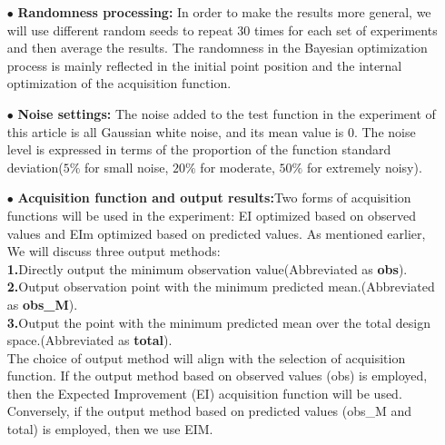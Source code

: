 \documentclass{article}
\begin{document}
\begin{itemize}
\item[$\bullet$] \textbf{Randomness processing:} In order to make the results more general, we will use different random seeds to repeat 30 times for each set of experiments and then average the results. The randomness in the Bayesian optimization process is mainly reflected in the initial point position and the internal optimization of the acquisition function.
\item[$\bullet$] \textbf{Noise settings:} The noise added to the test function in the experiment of this article is all Gaussian white noise, and its mean value is 0. The noise level is expressed in terms of the proportion of the function standard deviation($5\%$ for small noise, $20\%$ for moderate, $50\%$ for extremely noisy).
\item[$\bullet$] \textbf{Acquisition function and output results:}Two forms of acquisition functions will be used in the experiment: EI optimized based on observed values and EIm optimized based on predicted values. As mentioned earlier, We will discuss three output methods: \\
\textbf{1.}Directly output the minimum observation value(Abbreviated as \textbf{obs}).\\
\textbf{2.}Output observation point with the minimum predicted mean.(Abbreviated as \textbf{obs\_M}).\\
\textbf{3.}Output the point with the minimum predicted mean over the total design space.(Abbreviated as \textbf{total}).\\
The choice of output method will align with the selection of acquisition function. If the output method based on observed values (obs) is employed, then the Expected Improvement (EI) acquisition function will be used. Conversely, if the output method based on predicted values (obs\_M and total) is employed, then we use EIM.

\end{itemize}
\end{document}
